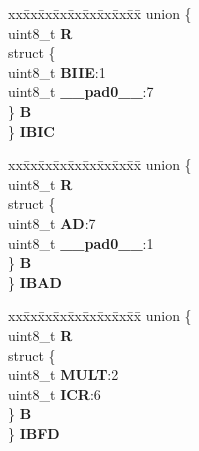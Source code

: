 \begin{DoxyCompactItemize}
\begin{tabbing}
\end{tabbing}\item 
\mbox{\label{structI2C__tag_a913139ae8aa5daf7743654884cfb1410}} 
\begin{tabbing}
xx\=xx\=xx\=xx\=xx\=xx\=xx\=xx\=xx\=\kill
union \{\\
\>uint8\_t {\bfseries R}\\
\>struct \{\\
\>\>uint8\_t {\bfseries BIIE}:1\\
\>\>uint8\_t {\bfseries \_\_pad0\_\_}:7\\
\>\} {\bfseries B}\\
\} {\bfseries IBIC}\\

\end{tabbing}\item 
\mbox{\label{structI2C__tag_a8aa69aaba52527b59a4e6136ff018fa7}} 
\begin{tabbing}
xx\=xx\=xx\=xx\=xx\=xx\=xx\=xx\=xx\=\kill
union \{\\
\>uint8\_t {\bfseries R}\\
\>struct \{\\
\>\>uint8\_t {\bfseries AD}:7\\
\>\>uint8\_t {\bfseries \_\_pad0\_\_}:1\\
\>\} {\bfseries B}\\
\} {\bfseries IBAD}\\

\end{tabbing}\item 
\mbox{\label{structI2C__tag_aa14ec102dcf5090751774ad76081d099}} 
\begin{tabbing}
xx\=xx\=xx\=xx\=xx\=xx\=xx\=xx\=xx\=\kill
union \{\\
\>uint8\_t {\bfseries R}\\
\>struct \{\\
\>\>uint8\_t {\bfseries MULT}:2\\
\>\>uint8\_t {\bfseries ICR}:6\\
\>\} {\bfseries B}\\
\} {\bfseries IBFD}\\


\end{tabbing}
\end{DoxyCompactItemize}
